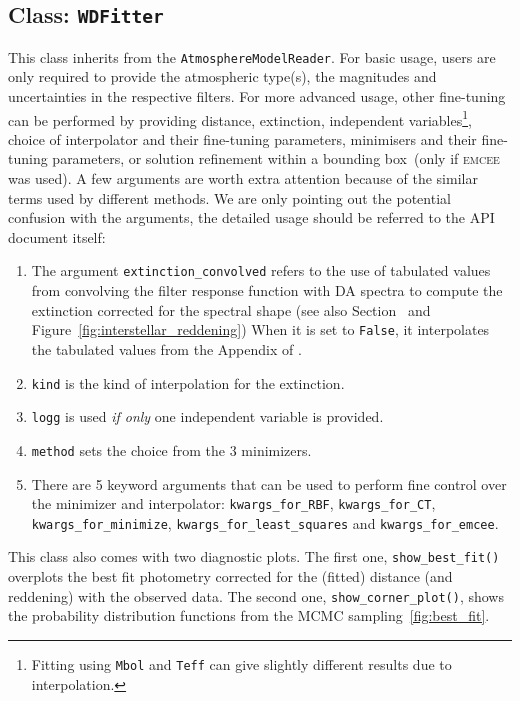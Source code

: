 \documentclass[fleqn,usenatbib]{rasti}
\begin{document}
\subsection{Class: \texttt{WDFitter}}
\label{sec:wdfitter}
This class inherits from the \texttt{AtmosphereModelReader}. For basic usage,
users are only required to provide the atmospheric type(s), the magnitudes and
uncertainties in the respective filters. For more advanced usage, other
fine-tuning can be performed by providing distance, extinction, independent
variables\footnote{Fitting using \texttt{Mbol} and \texttt{Teff} can give slightly
different results due to interpolation.}, choice of interpolator and their
fine-tuning parameters, minimisers and their fine-tuning parameters,
or solution refinement within a bounding box~(only if \textsc{emcee} was used).
A few arguments are worth extra attention because of the similar terms used
by different methods. We are only pointing out the potential confusion with
the arguments, the detailed usage should be referred to the API document
itself:
\begin{enumerate}
    \item The argument \texttt{extinction\_convolved} refers to the use of
    tabulated values from convolving the filter response function with DA
    spectra to compute the extinction corrected for the spectral shape
    (see also Section~ and Figure~\ref{fig:interstellar_reddening})
    When it is set to \texttt{False}, it interpolates the tabulated values
    from the Appendix of \citet{2011ApJ...737..103S}.
    \item \texttt{kind} is the kind of interpolation for the extinction.
    \item \texttt{logg} is used \textit{if only} one independent variable is
    provided.
    \item \texttt{method} sets the choice from the 3 minimizers.
    \item There are 5 keyword arguments that can be used to
    perform fine control over the minimizer and
    interpolator: \texttt{kwargs\_for\_RBF}, \texttt{kwargs\_for\_CT},
    \texttt{kwargs\_for\_minimize}, \texttt{kwargs\_for\_least\_squares} and
    \texttt{kwargs\_for\_emcee}.
\end{enumerate}

This class also comes with two diagnostic plots. The first one,
\texttt{show\_best\_fit()} overplots the best fit photometry corrected for the
(fitted) distance (and reddening) with the observed
data. The second one, \texttt{show\_corner\_plot()},
shows the probability distribution functions from the MCMC
sampling~\ref{fig:best_fit}.
\end{document}
